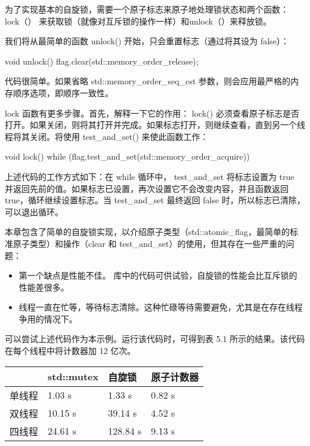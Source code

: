 为了实现基本的自旋锁，需要一个原子标志来原子地处理锁状态和两个函数： lock（） 来获取锁（就像对互斥锁的操作一样）和unlock（）来释放锁。


我们将从最简单的函数 unlock() 开始，只会重置标志（通过将其设为 false）：

\begin{cpp}
void unlock()
{
    flag.clear(std::memory_order_release);
}
\end{cpp}

代码很简单。如果省略 std::memory\_order\_seq\_cst 参数，则会应用最严格的内存顺序选项，即顺序一致性。


lock 函数有更多步骤。首先，解释一下它的作用： lock() 必须查看原子标志是否打开。如果关闭，则将其打开并完成。如果标志打开，则继续查看，直到另一个线程将其关闭。将使用 test\_and\_set() 来使此函数工作：

\begin{cpp}
void lock()
{
    while (flag.test_and_set(std::memory_order_acquire)) {}
}
\end{cpp}

上述代码的工作方式如下：在 while 循环中， test\_and\_set 将标志设置为 true 并返回先前的值。如果标志已设置，再次设置它不会改变内容，并且函数返回 true，循环继续设置标志。当 test\_and\_set 最终返回 false 时，所以标志已清除，可以退出循环。


本章包含了简单的自旋锁实现，以介绍原子类型（std::atomic\_flag，最简单的标准原子类型）和操作（clear 和 test\_and\_set）的使用，但其存在一些严重的问题：

\begin{itemize}
\item
第一个缺点是性能不佳。 库中的代码可供试验，自旋锁的性能会比互斥锁的性能差很多。

\item
线程一直在忙等，等待标志清除。这种忙碌等待需要避免，尤其是在存在线程争用的情况下。
\end{itemize}

可以尝试上述代码作为本示例。运行该代码时，可得到表 5.1 所示的结果。该代码在每个线程中将计数器加 12 亿次。

\begin{longtable}{|l|l|l|l|}
\hline
\textbf{} & \textbf{std::mutex} & \textbf{自旋锁} & \textbf{原子计数器} \\ \hline
\endfirsthead
%
\endhead
%
单线程       & 1.03 s              & 1.33 s       & 0.82 s         \\ \hline
双线程       & 10.15 s             & 39.14 s      & 4.52 s         \\ \hline
四线程       & 24.61 s             & 128.84 s     & 9.13 s         \\ \hline
\end{longtable}

